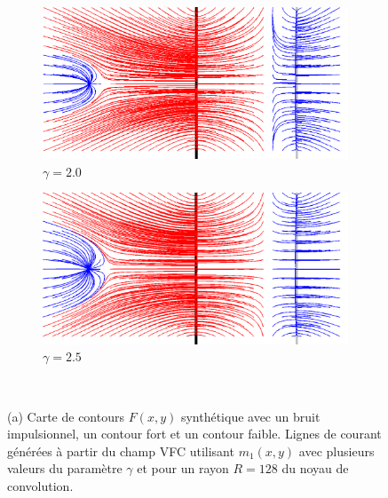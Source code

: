 \begin{appendices}
\begin{figure}[H]
   \begin{subfigure}[c]{.5\linewidth}
     \centering
     \includegraphics[scale=0.35]{Chapters/Images/m1_gamma_20.png}
     \caption{$\gamma=2.0$}
   \end{subfigure}
   \begin{subfigure}[c]{.5\linewidth}
     \centering
     \includegraphics[scale=0.35]{Chapters/Images/m1_gamma_25.png}
     \caption{$\gamma=2.5$}
   \end{subfigure}\\
   
   \caption{(a) Carte de contours $F(x,y)$ synthétique avec un bruit impulsionnel, un contour fort et un contour faible. Lignes de courant générées à partir du champ VFC utilisant $m_1(x,y)$ avec plusieurs valeurs du paramètre $\gamma$ et pour un rayon $R=128$ du noyau de convolution.}
   \label{fig:gamma}
\end{figure}

\end{appendices}
